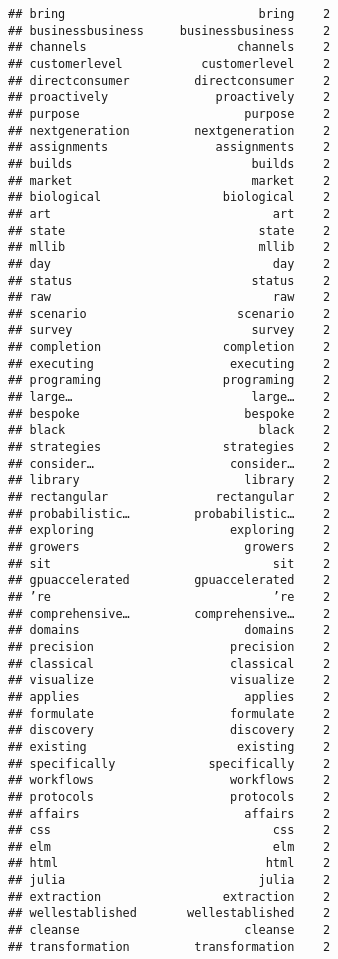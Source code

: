\documentclass[]{article}
\begin{document}
\begin{verbatim}
## bring                           bring    2
## businessbusiness     businessbusiness    2
## channels                     channels    2
## customerlevel           customerlevel    2
## directconsumer         directconsumer    2
## proactively               proactively    2
## purpose                       purpose    2
## nextgeneration         nextgeneration    2
## assignments               assignments    2
## builds                         builds    2
## market                         market    2
## biological                 biological    2
## art                               art    2
## state                           state    2
## mllib                           mllib    2
## day                               day    2
## status                         status    2
## raw                               raw    2
## scenario                     scenario    2
## survey                         survey    2
## completion                 completion    2
## executing                   executing    2
## programing                 programing    2
## large…                         large…    2
## bespoke                       bespoke    2
## black                           black    2
## strategies                 strategies    2
## consider…                   consider…    2
## library                       library    2
## rectangular               rectangular    2
## probabilistic…         probabilistic…    2
## exploring                   exploring    2
## growers                       growers    2
## sit                               sit    2
## gpuaccelerated         gpuaccelerated    2
## ’re                               ’re    2
## comprehensive…         comprehensive…    2
## domains                       domains    2
## precision                   precision    2
## classical                   classical    2
## visualize                   visualize    2
## applies                       applies    2
## formulate                   formulate    2
## discovery                   discovery    2
## existing                     existing    2
## specifically             specifically    2
## workflows                   workflows    2
## protocols                   protocols    2
## affairs                       affairs    2
## css                               css    2
## elm                               elm    2
## html                             html    2
## julia                           julia    2
## extraction                 extraction    2
## wellestablished       wellestablished    2
## cleanse                       cleanse    2
## transformation         transformation    2

\end{verbatim}
\end{document}
